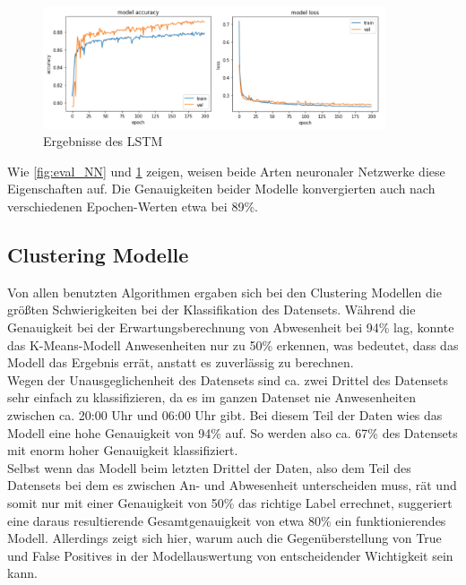 \begin{figure}[h]
    \centering
    \includegraphics[width=0.9\textwidth]{pic/eval_LSTM.png}
    \caption{Ergebnisse des LSTM}
    \label{fig:eval_LSTM}
\end{figure}

Wie \ref{fig:eval_NN} und \ref{fig:eval_LSTM} zeigen, weisen beide Arten neuronaler Netzwerke diese Eigenschaften auf. Die Genauigkeiten beider Modelle
konvergierten auch nach verschiedenen Epochen-Werten etwa bei 89\%.

\subsection{Clustering Modelle}
Von allen benutzten Algorithmen ergaben sich bei den Clustering Modellen die größten Schwierigkeiten bei der 
Klassifikation des Datensets. 
Während die Genauigkeit bei der Erwartungsberechnung von Abwesenheit bei 94\% lag, konnte das
K-Means-Modell Anwesenheiten nur zu 50\% erkennen, was bedeutet, dass das Modell das Ergebnis errät, anstatt
es zuverlässig zu berechnen. \\
Wegen der Unausgeglichenheit des Datensets sind ca. zwei Drittel des Datensets sehr einfach zu 
klassifizieren, da es im ganzen Datenset nie Anwesenheiten zwischen ca. 20:00 Uhr und 06:00 Uhr 
gibt. Bei diesem Teil der Daten wies das Modell eine hohe Genauigkeit von 94\% auf. So werden also ca. 67\% des 
Datensets mit enorm hoher Genauigkeit klassifiziert.\\
Selbst wenn das Modell beim letzten Drittel der Daten, also dem Teil des Datensets bei dem es zwischen
An- und Abwesenheit unterscheiden muss, rät und somit nur mit einer Genauigkeit von 50\% das richtige Label 
errechnet, suggeriert eine daraus resultierende Gesamtgenauigkeit von etwa 80\% ein funktionierendes Modell.
Allerdings zeigt sich hier, warum auch die Gegenüberstellung von True und False Positives in der 
Modellauswertung von entscheidender Wichtigkeit sein kann.\\

